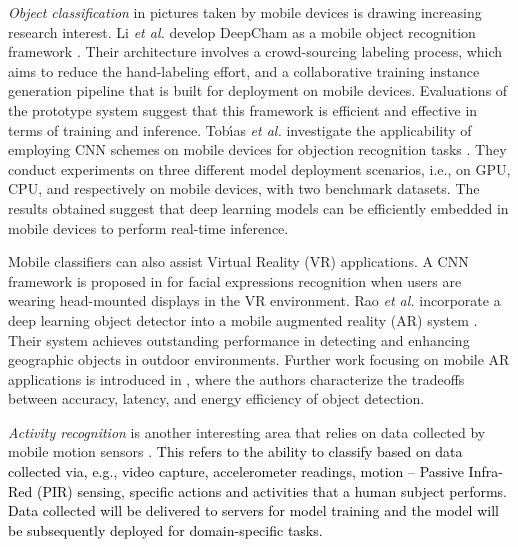 \documentclass[journal,comsoc,letter]{IEEEtran}
\newcommand{\edit}[1]{\textcolor{black}{#1}}
\begin{document}
\emph{Object classification} in pictures taken by mobile devices is drawing increasing research interest. Li \emph{et al.} develop DeepCham as a mobile object recognition framework \cite{li2016deepcham}. Their architecture involves a crowd-sourcing labeling process, which aims to reduce the hand-labeling effort, and a collaborative training instance generation pipeline that is built for deployment on mobile devices. Evaluations of the prototype system suggest that this framework is efficient and effective in terms of training and inference. Tob{\'\i}as \emph{et al.} investigate the applicability of employing CNN schemes on mobile devices for objection recognition tasks \cite{tobias2016convolutional}. They conduct experiments on three different model deployment scenarios, i.e., on GPU, CPU, and respectively on mobile devices, with two benchmark datasets. The results obtained suggest that deep learning models can be efficiently embedded in mobile devices to perform real-time inference.

Mobile classifiers can also assist Virtual Reality (VR) applications. A CNN framework is proposed in \cite{teng2016facial} for facial expressions recognition when users are wearing head-mounted displays in the VR environment. Rao \emph{et al.} incorporate a deep learning object detector into a mobile augmented reality (AR) system \cite{rao2017mobile}. Their system achieves outstanding performance in detecting and enhancing geographic objects in outdoor environments. Further work focusing on mobile AR applications is introduced in \cite{ran2017delivering}, where the authors characterize the tradeoffs between accuracy, latency, and energy efficiency of object detection. 



\emph{Activity recognition} is another interesting area that relies on data collected by mobile motion sensors \cite{wang2017deep, vyas2017survey}. \edit{This refers to the ability to classify based on data collected via, e.g., video capture, accelerometer readings, motion -- Passive Infra-Red (PIR) sensing, specific actions and activities that a human subject performs. Data collected will be delivered to servers for model training and the model will be subsequently deployed for domain-specific tasks.} 
\end{document}
